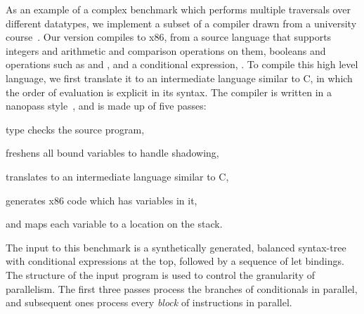 \documentclass[acmsmall,acmthm=false,nonacm]{acmart}
\theoremstyle{straighttext0}
\theoremstyle{straighttext}
\newcommand{\Figref}[1]{Figure~\ref{#1}}
\begin{document}
{As an example of a complex benchmark which performs multiple traversals over
different datatypes, we implement a subset of
a compiler drawn from a university course~\cite{iu_compilers_book}.
%
Our version compiles to x86, from a source language that supports
integers and arithmetic and comparison operations on them,
booleans and operations such as  and ,
and a conditional expression, .
%
%
To compile this high level language, we first translate it to an
intermediate language similar to C,
in which the order of evaluation is explicit in its syntax.
%
The compiler is written in a nanopass style~\cite{sarkar_nanopass},
and is made up of five passes:
\begin{enumerate*}[label*=(\arabic*)]
\item {} type checks the source program,
\item {} freshens all bound variables to handle shadowing,
\item {} translates to an
intermediate language similar to C,
\item {} generates x86 code which has variables in it,
\item and  maps each variable to a location on the stack.
\end{enumerate*}
%
The input to this benchmark is a synthetically generated, balanced syntax-tree
with conditional expressions at the top, followed by a sequence of let bindings.
%
The structure of the input program is used to control the granularity of parallelism.
%
The first three passes process the branches of conditionals in parallel,
and subsequent ones process every {\em block} of instructions in parallel.


}
\end{document}
